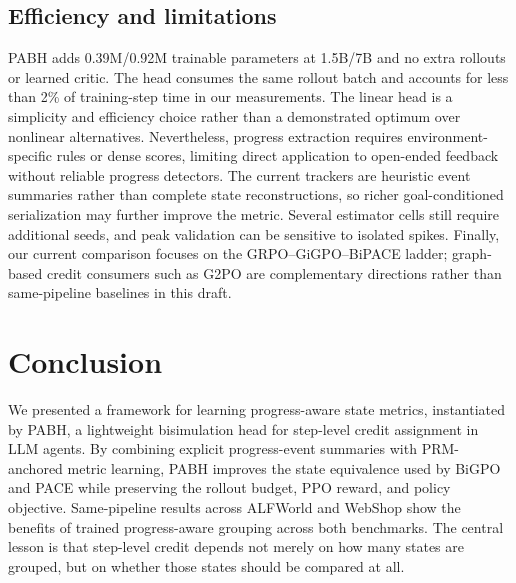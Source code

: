 \documentclass[10pt,twocolumn,letterpaper]{article}
\newcommand{\method}{PABH\xspace}
\begin{document}
\subsection{Efficiency and limitations}
\method adds 0.39M/0.92M trainable parameters at 1.5B/7B and no extra rollouts or learned critic. The head consumes the same rollout batch and accounts for less than 2\% of training-step time in our measurements. The linear head is a simplicity and efficiency choice rather than a demonstrated optimum over nonlinear alternatives. Nevertheless, progress extraction requires environment-specific rules or dense scores, limiting direct application to open-ended feedback without reliable progress detectors. The current trackers are heuristic event summaries rather than complete state reconstructions, so richer goal-conditioned serialization may further improve the metric. Several estimator cells still require additional seeds, and peak validation can be sensitive to isolated spikes. Finally, our current comparison focuses on the GRPO--GiGPO--BiPACE ladder; graph-based credit consumers such as G2PO are complementary directions rather than same-pipeline baselines in this draft.

\section{Conclusion}
We presented a framework for learning progress-aware state metrics, instantiated by \method, a lightweight bisimulation head for step-level credit assignment in LLM agents. By combining explicit progress-event summaries with PRM-anchored metric learning, \method improves the state equivalence used by BiGPO and PACE while preserving the rollout budget, PPO reward, and policy objective. Same-pipeline results across ALFWorld and WebShop show the benefits of trained progress-aware grouping across both benchmarks. The central lesson is that step-level credit depends not merely on how many states are grouped, but on whether those states should be compared at all.

{\small


}

\appendix

\end{document}
